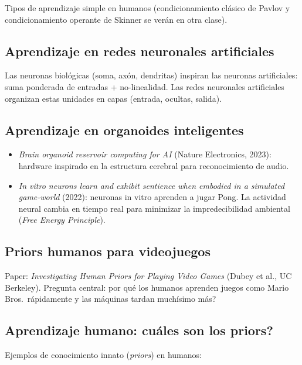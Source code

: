 \documentclass[11pt, a4paper]{article}
\begin{document}
Tipos de aprendizaje simple en humanos (condicionamiento cl\'asico de Pavlov y condicionamiento operante de Skinner se ver\'an en otra clase).

\subsection{Aprendizaje en redes neuronales artificiales}

Las neuronas biol\'ogicas (soma, ax\'on, dendritas) inspiran las neuronas artificiales: suma ponderada de entradas + no-linealidad. Las redes neuronales artificiales organizan estas unidades en capas (entrada, ocultas, salida).

\subsection{Aprendizaje en organoides inteligentes}

\begin{itemize}[nosep]
    \item \textit{Brain organoid reservoir computing for AI} (Nature Electronics, 2023): hardware inspirado en la estructura cerebral para reconocimiento de audio.
    \item \textit{In vitro neurons learn and exhibit sentience when embodied in a simulated game-world} (2022): neuronas in vitro aprenden a jugar Pong. La actividad neural cambia en tiempo real para minimizar la impredecibilidad ambiental (\emph{Free Energy Principle}).
\end{itemize}

\subsection{Priors humanos para videojuegos}

Paper: \textit{Investigating Human Priors for Playing Video Games} (Dubey et al., UC Berkeley). Pregunta central: \textquestiondown por qu\'e los humanos aprenden juegos como Mario Bros.\ r\'apidamente y las m\'aquinas tardan much\'isimo m\'as?

\subsection{Aprendizaje humano: \textquestiondown cu\'ales son los priors?}

Ejemplos de conocimiento innato (\emph{priors}) en humanos:
\end{document}
